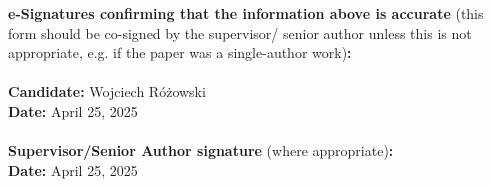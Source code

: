 		\textbf{e-Signatures confirming that the information above is accurate}
		(this form should be co-signed by the supervisor/ senior author unless this is not appropriate, e.g. if the paper was a single-author work)\textbf{:}\\
		\textbf{}\\ 
		\textbf{Candidate:}  Wojciech R\'{o}\.{z}owski\\
		\textbf{Date:} April 25, 2025\\
		\textbf{}\\
		\textbf{Supervisor/Senior Author signature} (where appropriate)\textbf{:}\\
		\textbf{Date:} April 25, 2025


